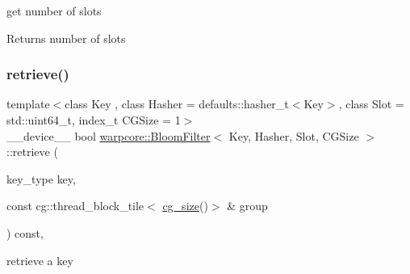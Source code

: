 get number of slots 

\begin{DoxyReturn}{Returns}
number of slots 
\end{DoxyReturn}
\mbox{\label{classwarpcore_1_1BloomFilter_a47ffce0fc70aa6bd7a0ed4b837fec1bd}} 
\subsubsection{\texorpdfstring{retrieve()}{retrieve()}\hspace{0.1cm}{\footnotesize\ttfamily [1/2]}}
{\footnotesize\ttfamily template$<$class Key , class Hasher  = defaults\+::hasher\+\_\+t$<$\+Key$>$, class Slot  = std\+::uint64\+\_\+t, index\+\_\+t C\+G\+Size = 1$>$ \\
\+\_\+\+\_\+device\+\_\+\+\_\+ bool \hyperlink{classwarpcore_1_1BloomFilter}{warpcore\+::\+Bloom\+Filter}$<$ Key, Hasher, Slot, C\+G\+Size $>$\+::retrieve (\begin{DoxyParamCaption}\item[{key\+\_\+type}]{key,  }\item[{const cg\+::thread\+\_\+block\+\_\+tile$<$ \hyperlink{classwarpcore_1_1BloomFilter_a6ad2335811852ad62fc65e85416d3904}{cg\+\_\+size}()$>$ \&}]{group }\end{DoxyParamCaption}) const\hspace{0.3cm}{\ttfamily [inline]}, {\ttfamily [noexcept]}}



retrieve a key 



